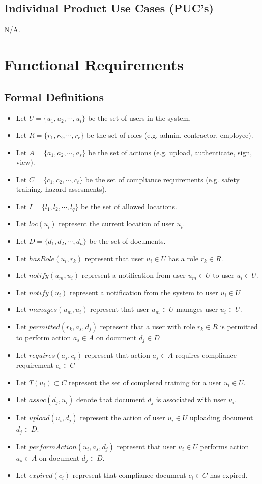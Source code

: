 \documentclass[12pt]{article}
\begin{document}
\subsection{Individual Product Use Cases (PUC's)}
N/A.
\section{Functional Requirements}
\subsection{Formal Definitions}
\begin{itemize}
  \item Let \(U = \{u_1, u_2, \cdots, u_i\}\) be the set of users in the system.
  \item Let \(R = \{r_1, r_2, \cdots, r_r\}\) be the set of roles (e.g. admin,
    contractor, employee).
  \item Let \(A = \{a_1, a_2, \cdots, a_s\}\) be the set of actions (e.g.
    upload, authenticate, sign, view).
  \item Let \(C = \{c_1, c_2, \cdots, c_t\}\) be the set of compliance
    requirements (e.g. safety training, hazard assesments).
  \item Let \(I = \{l_1, l_2, \cdots, l_q\}\) be the set of allowed locations.
  \item Let \(loc(u_i)\) represent the current location of user \(u_i\).
  \item Let \(D = \{d_1, d_2, \cdots, d_n\}\) be the set of documents.
  \item Let \(hasRole(u_i, r_k)\) represent that user \(u_i \in U\) has a role
    \(r_k \in R\).
  \item Let \(notify(u_m, u_i)\) represent a notification from user
    \(u_m \in U\) to user \(u_i \in U\).
  \item Let \(notify(u_i)\) represent a notification from the system to user
    \(u_i \in U\)
  \item Let \(manages(u_m, u_i)\) represent that user \(u_m \in U\)
    manages user \(u_i \in U\).
  \item Let \(permitted(r_k, a_s, d_j)\) represent that a user with
    role \(r_k \in R\) is permitted to perform action \(a_s \in A\)
    on document \(d_j \in D\)
  \item Let \(requires(a_s, c_t)\) represent that action \(a_s \in A\) requires
    compliance requirement \(c_t \in C\)
  \item Let \(T(u_i) \subset C\) represent the set of completed training for a
    user \(u_i \in U\).
  \item Let \(assoc(d_j, u_i)\) denote that document \(d_j\) is associated with
    user \(u_i\).
  \item Let \(upload(u_i, d_j)\) represent the action of user \(u_i \in U\)
    uploading document \(d_j \in D\).
  \item Let \(performAction(u_i, a_s, d_j)\) represent that user \(u_i \in U\)
    performs action \(a_s \in A\) on document \(d_j \in D\).
  \item Let \(expired(c_i)\) represent that compliance document \(c_i \in C\)
    has expired.
\end{itemize}
\end{document}
